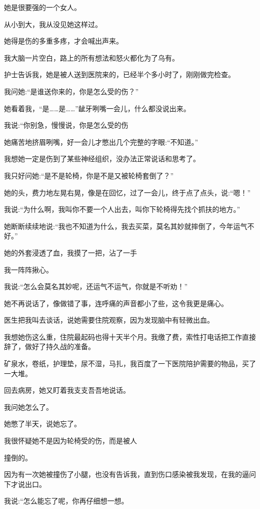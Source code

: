 \documentclass{article}
\begin{document}
她是很要强的一个女人。

从小到大，我从没见她这样过。

她得是伤的多重多疼，才会喊出声来。

我大脑一片空白，路上的所有想法和怒火都化为了乌有。

护士告诉我，她是被人送到医院来的，已经半个多小时了，刚刚做完检查。

我问她:“是谁送你来的，你是怎么受的伤？”

她看着我，“是……是……”龇牙咧嘴一会儿，什么都没说出来。

我说:“你别急，慢慢说，你是怎么受的伤

她痛苦地挤眉咧嘴，好一会儿才憋出几个完整的字眼:“不知道。”

我想她一定是伤到了某些神经组织，没办法正常说话和思考了。

我只好问她:“是不是轮椅，你是不是又被轮椅套倒了？”

她的头，费力地左晃右晃，像是在回忆，过了一会儿，终于点了点头，说:“嗯！”

\newpage 



我说:“为什么啊，我叫你不要一个人出去，叫你下轮椅得先找个抓扶的地方。”

她断断续续地说:“我也不知道为什么，我去买菜，莫名其妙就摔倒了，今年运气不好。”

她的外套浸透了血，我摸了一把，沾了一手

我一阵阵揪心。

我说:“怎么会莫名其妙呢，还运气不运气，你就是不听劝！”

她不再说话了，像做错了事，连呼痛的声音都小了些，这令我更是痛心。

医生把我叫去谈话，说她需要住院观察，因为发现脑中有轻微出血。

我想她伤这么重，住院最起码也得十天半个月。我缴了费，索性打电话把工作直接辞了，做好了持久战的准备。

矿泉水，卷纸，护理垫，尿不湿，马扎，我百度了一下医院陪护需要的物品，买了一大堆。

回去病房，她又盯着我支支吾吾地说话。

我问她怎么了。

她憋了半天，说她忘了。

我很怀疑她不是因为轮椅受的伤，而是被人

\newpage 

撞倒的。

因为有一次她被撞伤了小腿，也没有告诉我，直到伤口感染被我发现，在我的逼问下才说出口。

我说:“怎么能忘了呢，你再仔细想一想。
\end{document}
